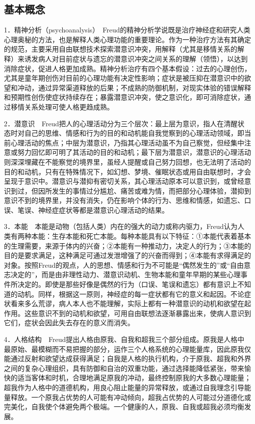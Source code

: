 \subsection{基本概念}

1．精神分析（psychoanalysis）　Freud的精神分析学说既是治疗神经症和研究人类心理奥秘的方法，也是解释人类心理功能的重要理论。作为一种治疗方法有其确定的规范，主要采用自由联想技术探索潜意识冲突，用解释（尤其是移情关系的解释）来诱发病人对目前症状与遗忘的潜意识冲突之间关系的理解（领悟），以达到消除症状，促进人格更加成熟。精神分析治疗有四个基本假设：过去的心理创伤，尤其是童年期创伤对目前的心理功能有决定性影响；症状是被压抑在潜意识中的欲望和冲动，通过异常渠道释放的后果；不成熟的防御机制，对现实体验的错误解释和预期性创伤使症状持续存在；暴露潜意识冲突，使之意识化，即可消除症状，通过移情关系处理可使人格更趋成熟。

2．潜意识　Freud把人的心理活动分为三个层次：最上层为意识，指人在清醒状态时对自己的思维、情感和行为的目的和动机能自我觉察到的心理活动领域，即当前心理活动的焦点；中层为潜意识，乃指其心理活动虽不为自己察觉，但经集中注意或努力回忆即可明了其活动的目的和动机；最下层为潜意识，潜意识的心理活动则深深埋藏在不能察觉的境界里，虽经人提醒或自己努力回想，也无法明了活动的目的和动机，只有在特殊情况下，如幻想、梦境、催眠状态或用自由联想时，才会呈现于意识中。潜意识与潜抑有密切关系，其心理活动原本可以意识到，或曾经意识到过，但因所发生的事情过分尴尬、痛苦或难为情，而把部分心理体验，潜抑到意识不到的境界里，并没有消失，仍在影响个体的行为、思维和情感，如遗忘、口误、笔误、神经症症状等都是潜意识心理活动的结果。

3．本能　本能是动物（包括人类）内在的强大的动力或称内驱力，Freud认为人类有两种本能：生存本能和死亡本能。每种本能具有以下特征：①本能代表着基本的生理需要，来源于体内的兴奋；②本能有一种推动力，决定人的行为；③本能的目的是要求满足，这种满足可通过发泄增强了的兴奋而得到；④本能有求得满足的对象。按照Freud的观点，人的思想、情感和行为不可能是“偶然发生的”或“自由意志决定的”，而是由非理性动力、潜意识动机、生物本能和童年早期的某些心理事件所决定的。即使是那些好像是偶然的行为（口误、笔误和遗忘）都有意识上不知道的动机。同样，根据这一原则，神经症的每一症状都有它的意义和起因。不论症状看来多么荒谬，病人本人也不能理解，实际上都有一种潜意识的动机和欲望在起作用。这些意识不到的动机和欲望，可用自由联想法逐渐暴露出来，使病人意识到它们，症状会因此失去存在的意义而消失。

4．人格结构　Freud提出人格由原我、自我和超我三个部分组成。原我是人格中最原始、最模糊而不易把握的部分，运作三个人格系统的心理能量库，因此原我仅能通过反射和欲望达成获得满足；自我是人格的执行机构，介于原我、超我和外界之间的复杂心理组织，具有防御和自治的双重功能，通过选择能降低紧张，带来愉快的适当客体和时机，合理地满足原我的冲动，最终控制原我的大多数心理能量；超我作为人格中的道德机构，用良心阻止能量的异常释放，或通过自我理念引导能量释放。一个原我占优势的人可能有冲动倾向，超我占优势的人可能过分道德化或完美化，自我使个体避免两个极端。一个健康的人，原我、自我或超我必须均衡发展。

